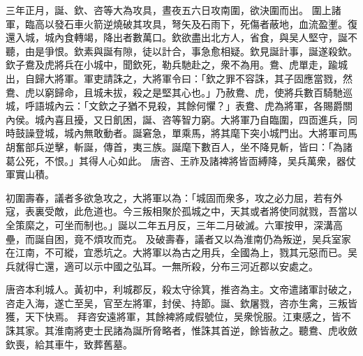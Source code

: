 \begin{pinyinscope}
 
三年正月，誕、欽、咨等大為攻具，晝夜五六日攻南圍，欲決圍而出。
 圍上諸軍，臨高以發石車火箭逆燒破其攻具，弩矢及石雨下，死傷者蔽地，血流盈壍。復還入城，城內食轉竭，降出者數萬口。欽欲盡出北方人，省食，與吴人堅守，誕不聽，由是爭恨。欽素與誕有隙，徒以計合，事急愈相疑。欽見誕計事，誕遂殺欽。欽子鴦及虎將兵在小城中，聞欽死，勒兵馳赴之，衆不為用。鴦、虎單走，踰城出，自歸大將軍。軍吏請誅之，大將軍令曰：「欽之罪不容誅，其子固應當戮，然鴦、虎以窮歸命，且城未拔，殺之是堅其心也。」乃赦鴦、虎，使將兵數百騎馳巡城，呼語城內云：「文欽之子猶不見殺，其餘何懼？」表鴦、虎為將軍，各賜爵關內侯。城內喜且擾，又日飢困，誕、咨等智力窮。大將軍乃自臨圍，四靣進兵，同時鼓譟登城，城內無敢動者。誕窘急，單乘馬，將其麾下突小城門出。大將軍司馬胡奮部兵逆擊，斬誕，傳首，夷三族。誕麾下數百人，坐不降見斬，皆曰：「為諸葛公死，不恨。」其得人心如此。
 唐咨、王祚及諸裨將皆靣縛降，吴兵萬衆，器仗軍實山積。
 
 
初圍壽春，議者多欲急攻之，大將軍以為：「城固而衆多，攻之必力屈，若有外寇，表裏受敵，此危道也。今三叛相聚於孤城之中，天其或者將使同就戮，吾當以全策縻之，可坐而制也。」誕以二年五月反，三年二月破滅。六軍按甲，深溝高壘，而誕自困，竟不煩攻而克。
 及破壽春，議者又以為淮南仍為叛逆，吴兵室家在江南，不可縱，宜悉坑之。大將軍以為古之用兵，全國為上，戮其元惡而已。吴兵就得亡還，適可以示中國之弘耳。一無所殺，分布三河近郡以安處之。
 
 
唐咨本利城人。黃初中，利城郡反，殺太守徐箕，推咨為主。文帝遣諸軍討破之，咨走入海，遂亡至吴，官至左將軍，封侯、持節。誕、欽屠戮，咨亦生禽，三叛皆獲，天下快焉。
 拜咨安遠將軍，其餘裨將咸假號位，吴衆恱服。江東感之，皆不誅其家。其淮南將吏士民諸為誕所脅略者，惟誅其首逆，餘皆赦之。聽鴦、虎收斂欽喪，給其車牛，致葬舊墓。
 
 
\end{pinyinscope}